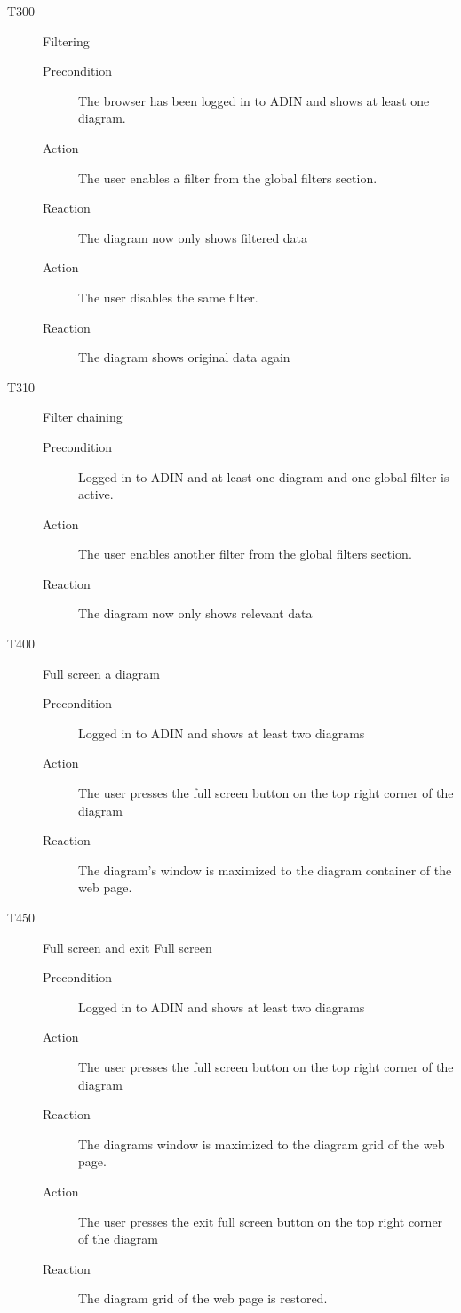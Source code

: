 \documentclass[twoside, english, final]{Pflichtenheft}
\begin{document}
\begin{description}
	\item[T300] Filtering
	      \begin{description}
		      \item[Precondition]
		            The browser has been logged in to ADIN and shows at least one diagram.
		      \item[Action]
		            The user enables a filter from the global filters section.
		      \item[Reaction]
		            The diagram now only shows filtered data
		      \item[Action]
		            The user disables the same filter.
		      \item[Reaction]
		            The diagram shows original data again
	      \end{description}

	\item[T310] Filter chaining
	      \begin{description}
		      \item[Precondition]
		            Logged in to ADIN and at least one diagram and one global filter is active.
		      \item[Action]
		            The user enables another filter from the global filters section.
		      \item[Reaction]
		            The diagram now only shows relevant data
	      \end{description}

	\item[T400] Full screen a diagram
	      \begin{description}
		      \item[Precondition]
		            Logged in to ADIN and shows at least two diagrams
		      \item[Action]
		            The user presses the full screen button on the top right corner of the diagram
		      \item[Reaction]
		            The diagram's window is maximized to the \gls{diagram container} of the web page.
	      \end{description}

	\item[T450] Full screen and exit Full screen
	      \begin{description}
		      \item[Precondition]
		            Logged in to ADIN and shows at least two diagrams
		      \item[Action]
		            The user presses the full screen button on the top right corner of the diagram
		      \item[Reaction]
		            The diagrams window is maximized to the diagram grid of the web page.
		      \item[Action]
		            The user presses the exit full screen button on the top right corner of the diagram
		      \item[Reaction]
		            The diagram grid of the web page is restored.
	      \end{description}


\end{description}
\end{document}
